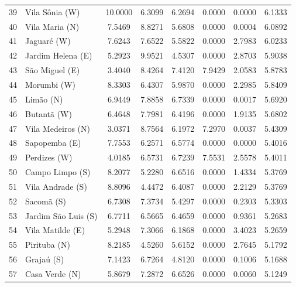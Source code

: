 \documentclass[12pt]{article}
\begin{document}
\begin{longtable}[c]{c|lccccc|c}
39  & Vila Sônia         (W) & 10.0000  & 6.3099   & 6.2694   & 0.0000   & 0.0000   & 6.1333  \\
40  & Vila Maria         (N) & 7.5469   & 8.8271   & 5.6808   & 0.0000   & 0.0004   & 6.0892  \\
41  & Jaguaré            (W) & 7.6243   & 7.6522   & 5.5822   & 0.0000   & 2.7983   & 6.0233  \\
42  & Jardim Helena      (E) & 5.2923   & 9.9521   & 4.5307   & 0.0000   & 2.8703   & 5.9038  \\
43  & São Miguel         (E) & 3.4040   & 8.4264   & 7.4120   & 7.9429   & 2.0583   & 5.8783  \\
44  & Morumbi            (W) & 8.3303   & 6.4307   & 5.9870   & 0.0000   & 2.2985   & 5.8409  \\
45  & Limão              (N) & 6.9449   & 7.8858   & 6.7339   & 0.0000   & 0.0017   & 5.6920  \\
46  & Butantã            (W) & 6.4648   & 7.7981   & 6.4196   & 0.0000   & 1.9135   & 5.6802  \\
47  & Vila Medeiros      (N) & 3.0371   & 8.7564   & 6.1972   & 7.2970   & 0.0037   & 5.4309  \\
48  & Sapopemba          (E) & 7.7553   & 6.2571   & 6.5774   & 0.0000   & 0.0000   & 5.4016  \\
49  & Perdizes           (W) & 4.0185   & 6.5731   & 6.7239   & 7.5531   & 2.5578   & 5.4011  \\
50  & Campo Limpo        (S) & 8.2077   & 5.2280   & 6.6516   & 0.0000   & 1.4334   & 5.3769  \\
51  & Vila Andrade       (S) & 8.8096   & 4.4472   & 6.4087   & 0.0000   & 2.2129   & 5.3769  \\
52  & Sacomã             (S) & 6.7308   & 7.3734   & 5.4297   & 0.0000   & 0.2303   & 5.3303  \\
53  & Jardim São Luis    (S) & 6.7711   & 6.5665   & 6.4659   & 0.0000   & 0.9361   & 5.2683  \\
54  & Vila Matilde       (E) & 5.2948   & 7.3066   & 6.1868   & 0.0000   & 3.4023   & 5.2659  \\
55  & Pirituba           (N) & 8.2185   & 4.5260   & 5.6152   & 0.0000   & 2.7645   & 5.1792  \\
56  & Grajaú             (S) & 7.1423   & 6.7264   & 4.8120   & 0.0000   & 0.1006   & 5.1688  \\
57  & Casa Verde         (N) & 5.8679   & 7.2872   & 6.6526   & 0.0000   & 0.0060   & 5.1249  \\

\end{longtable}
\end{document}
